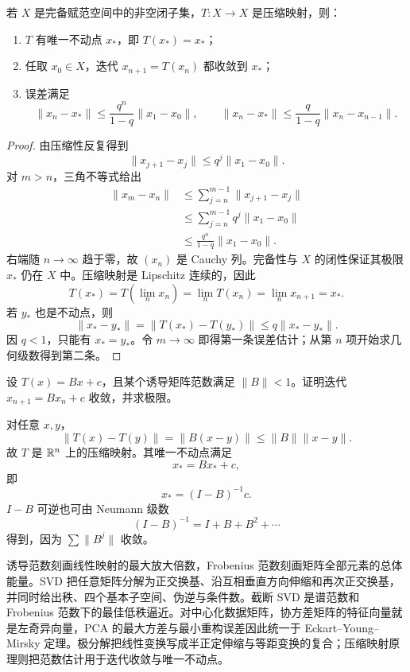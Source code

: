 \begin{theorem}
若 $X$ 是完备赋范空间中的非空闭子集，$T:X\to X$ 是压缩映射，则：
\begin{enumerate}
\item $T$ 有唯一不动点 $x_*$，即 $T(x_*)=x_*$；
\item 任取 $x_0\in X$，迭代 $x_{n+1}=T(x_n)$ 都收敛到 $x_*$；
\item 误差满足
\[
\lVert x_n-x_*\rVert
\le\frac{q^n}{1-q}\lVert x_1-x_0\rVert,
\qquad
\lVert x_n-x_*\rVert
\le\frac q{1-q}\lVert x_n-x_{n-1}\rVert.
\]
\end{enumerate}
\end{theorem}
\begin{proof}
由压缩性反复得到
\[
\lVert x_{j+1}-x_j\rVert\le q^j\lVert x_1-x_0\rVert.
\]
对 $m>n$，三角不等式给出
\begin{align*}
\lVert x_m-x_n\rVert
&\le\sum_{j=n}^{m-1}\lVert x_{j+1}-x_j\rVert\\
&\le\sum_{j=n}^{m-1}q^j\lVert x_1-x_0\rVert\\
&\le\frac{q^n}{1-q}\lVert x_1-x_0\rVert.
\end{align*}
右端随 $n\to\infty$ 趋于零，故 $(x_n)$ 是 Cauchy 列。完备性与 $X$ 的闭性保证其极限 $x_*$ 仍在 $X$ 中。压缩映射是 Lipschitz 连续的，因此
\[
T(x_*)=T\left(\lim_nx_n\right)=\lim_nT(x_n)=\lim_nx_{n+1}=x_*.
\]
若 $y_*$ 也是不动点，则
\[
\lVert x_*-y_*\rVert
=\lVert T(x_*)-T(y_*)\rVert
\le q\lVert x_*-y_*\rVert.
\]
因 $q<1$，只能有 $x_*=y_*$。令 $m\to\infty$ 即得第一条误差估计；从第 $n$ 项开始求几何级数得到第二条。
\end{proof}

\begin{example}[title={线性迭代的收敛}]
设 $T(x)=Bx+c$，且某个诱导矩阵范数满足 $\lVert B\rVert<1$。证明迭代 $x_{n+1}=Bx_n+c$ 收敛，并求极限。
\begin{solution}
对任意 $x,y$，
\[
\lVert T(x)-T(y)\rVert=\lVert B(x-y)\rVert
\le\lVert B\rVert\lVert x-y\rVert.
\]
故 $T$ 是 $\mathbb{R}^n$ 上的压缩映射。其唯一不动点满足
\[
x_*=Bx_*+c,
\]
即
\[
x_*=(I-B)^{-1}c.
\]
$I-B$ 可逆也可由 Neumann 级数
\[
(I-B)^{-1}=I+B+B^2+\cdots
\]
得到，因为 $\sum\lVert B^j\rVert$ 收敛。
\end{solution}
\end{example}

\begin{summary}[本章知识链]
诱导范数刻画线性映射的最大放大倍数，Frobenius 范数刻画矩阵全部元素的总体能量。SVD 把任意矩阵分解为正交换基、沿互相垂直方向伸缩和再次正交换基，并同时给出秩、四个基本子空间、伪逆与条件数。截断 SVD 是谱范数和 Frobenius 范数下的最佳低秩逼近。对中心化数据矩阵，协方差矩阵的特征向量就是左奇异向量，PCA 的最大方差与最小重构误差因此统一于 Eckart--Young--Mirsky 定理。极分解把线性变换写成半正定伸缩与等距变换的复合；压缩映射原理则把范数估计用于迭代收敛与唯一不动点。
\end{summary}
